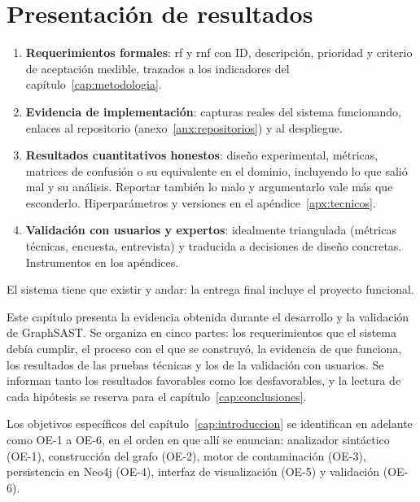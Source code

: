 
\chapter{Presentación de resultados}\label{cap:resultados}

\begin{guia}
\begin{enumerate}
    \item \textbf{Requerimientos formales}: \gls{rf} y \gls{rnf} con ID,
          descripción, prioridad y criterio de aceptación medible,
          trazados a los indicadores del capítulo~\ref{cap:metodologia}.
    \item \textbf{Evidencia de implementación}: capturas reales del sistema
          funcionando, enlaces al repositorio (anexo~\ref{anx:repositorios})
          y al despliegue.
    \item \textbf{Resultados cuantitativos honestos}: diseño experimental,
          métricas, matrices de confusión o su equivalente en el dominio,
          incluyendo lo que salió mal y su análisis. Reportar también lo
          malo y argumentarlo vale más que esconderlo. Hiperparámetros y
          versiones en el apéndice~\ref{apx:tecnicos}.
    \item \textbf{Validación con usuarios y expertos}: idealmente
          triangulada (métricas técnicas, encuesta, entrevista) y
          traducida a decisiones de diseño concretas. Instrumentos en
          los apéndices.
\end{enumerate}
El sistema tiene que existir y andar: la entrega final incluye el
proyecto funcional.
\end{guia}

Este capítulo presenta la evidencia obtenida durante el desarrollo y la
validación de GraphSAST. Se organiza en cinco partes: los requerimientos
que el sistema debía cumplir, el proceso con el que se construyó, la
evidencia de que funciona, los resultados de las pruebas técnicas y los
de la validación con usuarios. Se informan tanto los resultados
favorables como los desfavorables, y la lectura de cada hipótesis se
reserva para el capítulo~\ref{cap:conclusiones}.

Los objetivos específicos del capítulo~\ref{cap:introduccion} se
identifican en adelante como OE-1 a OE-6, en el orden en que allí se
enuncian: analizador sintáctico (OE-1), construcción del grafo (OE-2),
motor de contaminación (OE-3), persistencia en Neo4j (OE-4), interfaz de
visualización (OE-5) y validación (OE-6).

